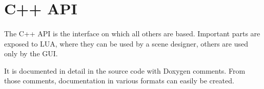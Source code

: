 \section{C++ API}
\paragraph{}
The C++ API is the interface on which all others are based.
Important parts are exposed to LUA, where they can be used by a scene designer, others are used only by the GUI.

It is documented in detail in the source code with Doxygen comments.
From those comments, documentation in various formats can easily be created.

